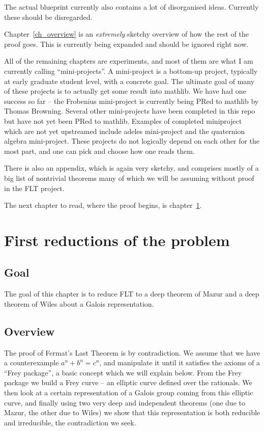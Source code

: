 The actual blueprint currently also contains a lot of disorganised ideas. Currently these
should be disregarded.

Chapter~\ref{ch_overview} is an \emph{extremely} sketchy overview of how
the rest of the proof goes. This is currently being expanded and should be ignored
right now.

All of the remaining chapters are experiments, and most of them are what I am currently
calling ``mini-projects''. A mini-project is a bottom-up project, typically at early graduate
student level, with a concrete goal. The ultimate goal of many of these projects is to actually
get some result into mathlib. We have had one success so far -- the Frobenius mini-project
is currently being PRed to mathlib by Thomas Browning. Several other mini-projects have
been completed in this repo but have not yet been PRed to mathlib. Examples of completed
miniproject which are not yet upstreamed include adeles
mini-project and the quaternion algebra mini-project. These projects do not logically depend
on each other for the most part, and one can pick and choose how one reads them.

There is also an appendix, which is again very sketchy, and comprises mostly of a big
list of nontrivial theorems many of which we will be assuming without proof in the FLT
project.

The next chapter to read, where the proof begins, is chapter~\ref{ch_reductions}.


\chapter{First reductions of the problem}\label{ch_reductions}

\section{Goal}

The goal of this chapter is to reduce FLT to a deep theorem of Mazur and a deep theorem of Wiles
about a Galois representation.

\section{Overview}
The proof of Fermat's Last Theorem is by contradiction. We assume that we have a counterexample
$a^n+b^n=c^n$, and manipulate it until it satisfies the axioms of a ``Frey package'', a basic
concept which we will explain below. From the
Frey package we build a Frey curve -- an elliptic curve defined over the rationals. We then look at
a certain representation of a Galois group coming from this elliptic curve, and finally using two
very deep and independent theorems (one due to Mazur, the other due to Wiles) we show that this
representation is both reducible and irreducible, the contradiction we seek.

